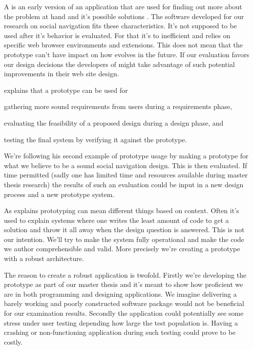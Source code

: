A  is an early version of an application that are used for
finding out more about the problem at hand and it's possible solutions
\citep[]{sommerville07}.
The software developed for our research on social navigation fits these
characteristics. It's not supposed to be used after it's behavior is
evaluated. For that it's to inefficient and relies on specific web browser
environments and extensions. This does not mean that the prototype can't have
impact on how \urort{} evolves in the future. If our evaluation favors our
design decisions the developers of \urort{} might take advantage of such
potential improvements in their web site design.

\citet[]{sommerville07} explains that a prototype can be used for
\begin{inparaenum}[(i)]
  \item gathering more sound requirements from users during a
    requirements phase,
  \item evaluating the feasibility of a proposed design during a
    design phase, and
  \item testing the final system by verifying it against the prototype.
\end{inparaenum}
We're following his second example of prototype usage by making a prototype
for what we believe to be a sound social navigation design. This is then
evaluated. If time permitted (sadly one has limited time and resources
available during master thesis research) the results of such an evaluation
could be input in a new design process and a new prototype system.

As \citet[]{mcconnell04} explains prototyping can mean different things
based on context. Often it's used to explain systems where one writes the
least amount of code to get a solution and throw it all away when the design
question is answered. This is not our intention. We'll try to make the system
fully operational and make the code we author comprehensible and
valid. More precisely we're creating a  prototype
\cite[]{rudd96} with a robust architecture.

The reason to create a robust application is twofold. Firstly we're developing
the prototype as part of our master thesis and it's meant to show how
proficient we are in both programming and designing applications. We
imagine delivering a barely working and poorly constructed software package
would not be beneficial for our examination results.
Secondly the application could potentially see some stress under user testing
depending how large the test population is. Having a crashing or
non-functioning application during such testing could prove to be costly.

